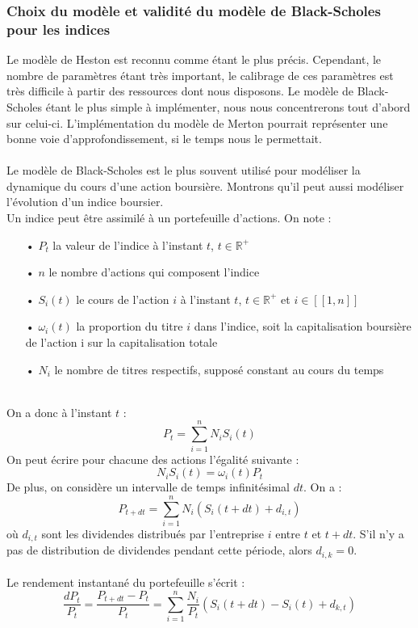 \documentclass[french,12pt,a4paper]{article}
\begin{document}
\subsubsection{Choix du modèle et validité du modèle de Black-Scholes pour les indices}
Le modèle de Heston est reconnu comme étant le plus précis. Cependant, le nombre de paramètres étant très important, le calibrage de ces paramètres est très difficile à partir des ressources dont nous disposons. Le modèle de Black-Scholes étant le plus simple à implémenter, nous nous concentrerons tout d'abord sur celui-ci. L'implémentation du modèle de Merton pourrait représenter une bonne voie d'approfondissement, si le temps nous le permettait. \\ \\
Le modèle de Black-Scholes est le plus souvent utilisé pour modéliser la dynamique du cours d'une action boursière. Montrons qu'il peut aussi modéliser l'évolution d'un indice boursier. \\
Un indice peut être assimilé à un portefeuille d'actions. On note :
\begin{itemize}
\item[•] $P_t$ la valeur de l'indice à l'instant $t$, $t \in \mathbb{R}^{+} $
\item[•] $n$ le nombre d'actions qui composent l'indice
\item[•] $S_{i}(t)$ le cours de l'action $i$ à l'instant $t$, $t \in  \mathbb{R}^{+} $ et $i \in [[1,n]] $
\item[•] $ \omega_i (t) $ la proportion du titre $i$ dans l'indice, soit la capitalisation boursière de l'action i sur la capitalisation totale
\item[•] $N_i $ le nombre de titres respectifs, supposé constant au cours du temps\\
\end{itemize}
\\
On a donc à l'instant $t$ :
$$P_t = \sum_{i=1}^{n}N_{i}S_{i}(t) $$
On peut écrire pour chacune des actions l'égalité suivante :
$$ N_{i}S_{i}(t) = \omega_i(t)P_t $$
De plus, on considère un intervalle de temps infinitésimal $dt$. On a :
$$ P_{t+dt} = \sum_{i=1}^{n}N_i(S_i(t+dt) + d_{i,t}) $$
où $d_{i,t}$ sont les dividendes distribués par l'entreprise $i$ entre $t$ et $t+dt$. S'il n'y a pas de distribution de dividendes pendant cette période, alors $d_{i,k}=0$.
\\
\\
Le rendement instantané du portefeuille s'écrit :
$$ \frac{dP_t}{P_t} = \frac{P_{t+dt}-P_t}{P_t} = \sum_{i=1}^n\frac{N_i}{P_t}(S_i(t+dt)-S_i(t) + d_{k,t})   $$
\end{document}
